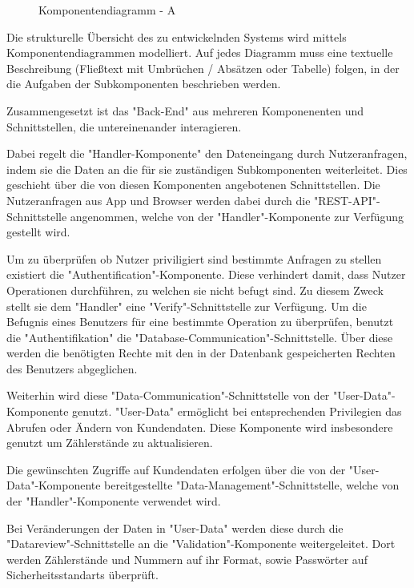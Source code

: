 \begin{figure}[h]
	\centering
	\caption{Komponentendiagramm - A}
	\label{fig:komponentendiagramm-a}
\end{figure}

\begin{tcolorbox}
Die strukturelle Übersicht des zu entwickelnden Systems wird mittels Komponentendiagrammen modelliert. 
Auf jedes Diagramm muss eine textuelle Beschreibung (Fließtext mit Umbrüchen / Absätzen oder Tabelle) folgen, in der die Aufgaben der Subkomponenten beschrieben werden. 
\end{tcolorbox}

Zusammengesetzt ist das "Back-End" aus mehreren Komponenenten und Schnittstellen, die untereinenander interagieren.

Dabei regelt die "Handler-Komponente" den Dateneingang durch Nutzeranfragen, indem sie die Daten an die für sie zuständigen Subkomponenten weiterleitet. Dies geschieht über die von diesen Komponenten angebotenen Schnittstellen. Die Nutzeranfragen aus App und Browser werden dabei durch die "REST-API"-Schnittstelle angenommen, welche von der "Handler"-Komponente zur Verfügung gestellt wird. 

Um zu überprüfen ob Nutzer priviligiert sind bestimmte Anfragen zu stellen existiert die "Authentification"-Komponente. Diese verhindert damit, dass Nutzer Operationen durchführen, zu welchen sie nicht befugt sind. Zu diesem Zweck stellt sie dem "Handler" eine "Verify"-Schnittstelle zur Verfügung. Um die Befugnis eines Benutzers für eine bestimmte Operation zu überprüfen, benutzt die "Authentifikation" die "Database-Communication"-Schnittstelle. Über diese werden die benötigten Rechte mit den in der Datenbank gespeicherten Rechten des Benutzers abgeglichen.

Weiterhin wird diese "Data-Communication"-Schnittstelle von der "User-Data"-Komponente genutzt. "User-Data" ermöglicht bei entsprechenden Privilegien das Abrufen oder Ändern von Kundendaten. Diese Komponente wird insbesondere genutzt um Zählerstände zu aktualisieren. 

Die gewünschten Zugriffe auf Kundendaten erfolgen über die von der "User-Data"-Komponente bereitgestellte "Data-Management"-Schnittstelle, welche von der "Handler"-Komponente verwendet wird. 

Bei Veränderungen der Daten in "User-Data" werden diese durch die "Datareview"-Schnittstelle an die "Validation"-Komponente weitergeleitet. Dort werden Zählerstände und Nummern auf ihr Format, sowie Passwörter auf Sicherheitsstandarts überprüft.

